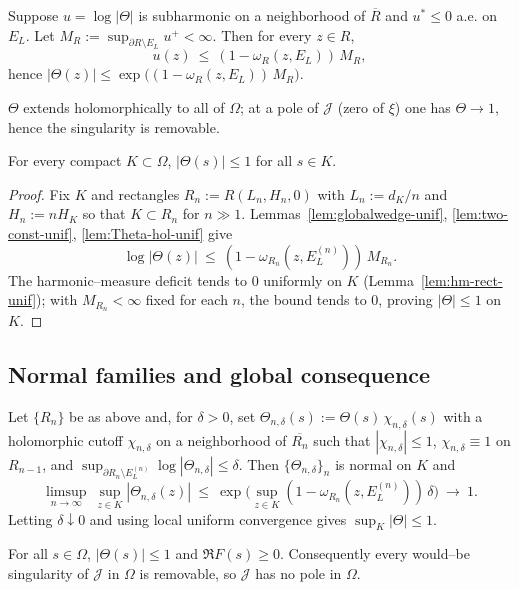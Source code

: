 \begin{lemma}\label{lem:two-const-unif}
Suppose $u=\log|\Theta|$ is subharmonic on a neighborhood of $\overline R$ and $u^*\le 0$ a.e. on $E_L$. Let $M_R:=\sup_{\partial R\setminus E_L} u^+<\infty$. Then for every $z\in R$,
\[u(z)\ \le\ (1-\omega_R(z,E_L))\,M_R,\]
hence $|\Theta(z)|\le \exp\!\big((1-\omega_R(z,E_L))\,M_R\big)$.
\end{lemma}

\begin{lemma}\label{lem:Theta-hol-unif}
$\Theta$ extends holomorphically to all of $\Omega$; at a pole of $\mathcal J$ (zero of $\xi$) one has $\Theta\to 1$, hence the singularity is removable.
\end{lemma}

\begin{theorem}\label{thm:pinch-unif}
For every compact $K\subset\Omega$, $|\Theta(s)|\le 1$ for all $s\in K$.
\end{theorem}

\begin{proof}
Fix $K$ and rectangles $R_n:=R(L_n,H_n,0)$ with $L_n:=d_K/n$ and $H_n:=n H_K$ so that $K\subset R_n$ for $n\gg1$. Lemmas~\ref{lem:globalwedge-unif}, \ref{lem:two-const-unif}, \ref{lem:Theta-hol-unif} give
\[\log|\Theta(z)|\ \le\ (1-\omega_{R_n}(z,E_L^{(n)}))\,M_{R_n}.\]
The harmonic–measure deficit tends to 0 uniformly on $K$ (Lemma~\ref{lem:hm-rect-unif}); with $M_{R_n}<\infty$ fixed for each $n$, the bound tends to 0, proving $|\Theta|\le 1$ on $K$.
\end{proof}

\subsection*{Normal families and global consequence}

\begin{proposition}\label{prop:compact-unif}
Let $\{R_n\}$ be as above and, for $\delta>0$, set $\Theta_{n,\delta}(s):=\Theta(s)\,\chi_{n,\delta}(s)$ with a holomorphic cutoff $\chi_{n,\delta}$ on a neighborhood of $\overline{R_n}$ such that $|\chi_{n,\delta}|\le 1$, $\chi_{n,\delta}\equiv 1$ on $R_{n-1}$, and $\sup_{\partial R_n\setminus E_L^{(n)}}\log|\Theta_{n,\delta}|\le \delta$. Then $\{\Theta_{n,\delta}\}_n$ is normal on $K$ and
\[\limsup_{n\to\infty}\ \sup_{z\in K}|\Theta_{n,\delta}(z)|\ \le\ \exp\!\big(\sup_{z\in K}(1-\omega_{R_n}(z,E_L^{(n)}))\,\delta\big)\ \to\ 1.\]
Letting $\delta\downarrow 0$ and using local uniform convergence gives $\sup_K|\Theta|\le 1$.
\end{proposition}

\begin{theorem}\label{thm:global-unif}
For all $s\in\Omega$, $|\Theta(s)|\le 1$ and $\Re F(s)\ge 0$. Consequently every would–be singularity of $\mathcal J$ in $\Omega$ is removable, so $\mathcal J$ has no pole in $\Omega$.
\end{theorem}

